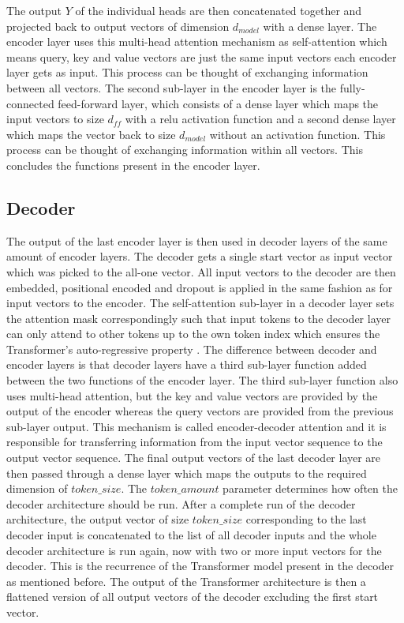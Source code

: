 \documentclass[draft,final]{vutinfth} %
\begin{document}
    The output $Y$ of the individual heads are then concatenated together and projected back to output vectors of dimension $d_{model}$ with a dense layer. 
    The encoder layer uses this multi-head attention mechanism as self-attention which means query, key and value vectors are just the same input vectors each encoder layer gets as input.
    This process can be thought of exchanging information between all vectors.
    The second sub-layer in the encoder layer is the fully-connected feed-forward layer, which consists of a dense layer which maps the input vectors to size $d_{ff}$ with a relu activation function and a second dense layer which maps the vector back to size $d_{model}$ without an activation function.
    This process can be thought of exchanging information within all vectors.
    This concludes the functions present in the encoder layer.
    \subsection{Decoder} \label{decoder}
    The output of the last encoder layer is then used in decoder layers of the same amount of encoder layers.
    The decoder gets a single start vector as input vector which was picked to the all-one vector.
    All input vectors to the decoder are then embedded, positional encoded and dropout is applied in the same fashion as for input vectors to the encoder.
    The self-attention sub-layer in a decoder layer sets the attention mask correspondingly such that input tokens to the decoder layer can only attend to other tokens up to the own token index which ensures the Transformer's auto-regressive property \cite[p. 5]{Transformer}.  
    The difference between decoder and encoder layers is that decoder layers have a third sub-layer function added between the two functions of the encoder layer.
    The third sub-layer function also uses multi-head attention, but the key and value vectors are provided by the output of the encoder whereas the query vectors are provided from the previous sub-layer output.
    This mechanism is called encoder-decoder attention and it is responsible for transferring information from the input vector sequence to the output vector sequence.
    The final output vectors of the last decoder layer are then passed through a dense layer which maps the outputs to the required dimension of $token\_size$.
    The $token\_amount$ parameter determines how often the decoder architecture should be run.
    After a complete run of the decoder architecture, the output vector of size $token\_size$ corresponding to the last decoder input is concatenated to the list of all decoder inputs and the whole decoder architecture is run again, now with two or more input vectors for the decoder.
    This is the recurrence of the Transformer model present in the decoder as mentioned before.
    The output of the Transformer architecture is then a flattened version of all output vectors of the decoder excluding the first start vector.
\end{document}
